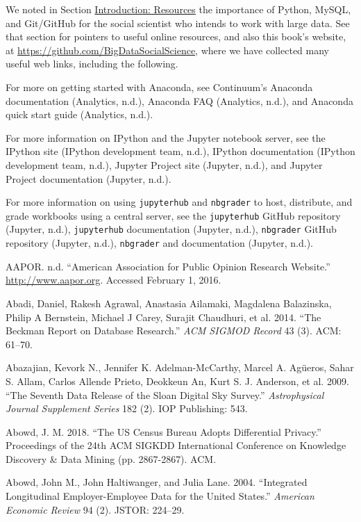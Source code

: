 \documentclass[]{krantz}
\begin{document}
We noted in Section \protect\hyperlink{chap:intro}{Introduction:
Resources} the importance of Python, MySQL, and Git/GitHub for the
social scientist who intends to work with large data. See that section
for pointers to useful online resources, and also this book's website,
at \url{https://github.com/BigDataSocialScience}, where we have
collected many useful web links, including the following.

For more on getting started with Anaconda, see Continuum's Anaconda
documentation (Analytics, n.d.), Anaconda FAQ (Analytics, n.d.), and
Anaconda quick start guide (Analytics, n.d.).

For more information on IPython and the Jupyter notebook server, see the
IPython site (IPython development team, n.d.), IPython documentation
(IPython development team, n.d.), Jupyter Project site (Jupyter, n.d.),
and Jupyter Project documentation (Jupyter, n.d.).

For more information on using \texttt{jupyterhub} and \texttt{nbgrader}
to host, distribute, and grade workbooks using a central server, see the
\texttt{jupyterhub} GitHub repository (Jupyter, n.d.),
\texttt{jupyterhub} documentation (Jupyter, n.d.), \texttt{nbgrader}
GitHub repository (Jupyter, n.d.), \texttt{nbgrader} and documentation
(Jupyter, n.d.).

\hypertarget{refs}{}
\hypertarget{ref-aaporWeb}{}
AAPOR. n.d. ``American Association for Public Opinion Research
Website.'' \url{http://www.aapor.org}. Accessed February 1, 2016.

\hypertarget{ref-abadi2014beckman}{}
Abadi, Daniel, Rakesh Agrawal, Anastasia Ailamaki, Magdalena Balazinska,
Philip A Bernstein, Michael J Carey, Surajit Chaudhuri, et al. 2014.
``The Beckman Report on Database Research.'' \emph{ACM SIGMOD Record} 43
(3). ACM: 61--70.

\hypertarget{ref-abazajian2009seventh}{}
Abazajian, Kevork N., Jennifer K. Adelman-McCarthy, Marcel A. Agüeros,
Sahar S. Allam, Carlos Allende Prieto, Deokkeun An, Kurt S. J. Anderson,
et al. 2009. ``The Seventh Data Release of the Sloan Digital Sky
Survey.'' \emph{Astrophysical Journal Supplement Series} 182 (2). IOP
Publishing: 543.

\hypertarget{ref-abowed2018}{}
Abowd, J. M. 2018. ``The US Census Bureau Adopts Differential Privacy.''
Proceedings of the 24th ACM SIGKDD International Conference on Knowledge
Discovery \& Data Mining (pp. 2867-2867). ACM.

\hypertarget{ref-abowd2004integrated}{}
Abowd, John M., John Haltiwanger, and Julia Lane. 2004. ``Integrated
Longitudinal Employer-Employee Data for the United States.''
\emph{American Economic Review} 94 (2). JSTOR: 224--29.
\end{document}
